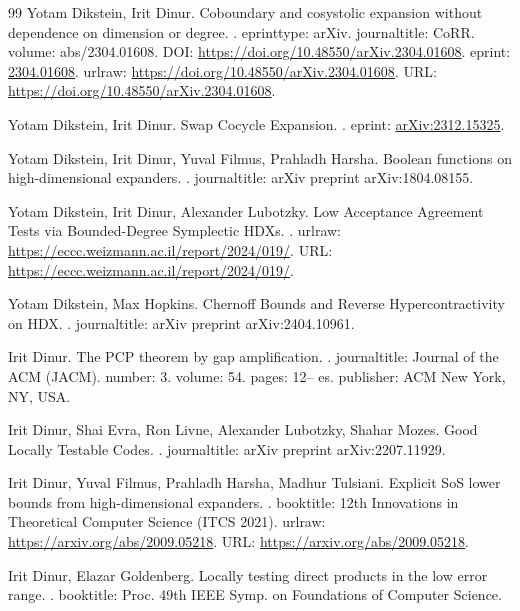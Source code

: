 \documentclass[10pt,a4paper]{article}
\theoremstyle{definition}
\theoremstyle{remark}
\numberwithin{equation}{section}
\begin{document}
\begin{thebibliography}{99}
Yotam Dikstein, Irit Dinur.
\newblock Coboundary and cosystolic expansion without dependence on dimension or degree.
.
\newblock eprinttype: arXiv.
\newblock journaltitle: CoRR.
\newblock volume: abs/2304.01608.
\newblock DOI: \url{https://doi.org/10.48550/arXiv.2304.01608}.
\newblock eprint: \url{2304.01608}.
\newblock urlraw: \url{https://doi.org/10.48550/arXiv.2304.01608}.
\newblock URL: \url{https://doi.org/10.48550/arXiv.2304.01608}.

Yotam Dikstein, Irit Dinur.
\newblock Swap Cocycle Expansion.
.
\newblock eprint: \url{arXiv:2312.15325}.

Yotam Dikstein, Irit Dinur, Yuval Filmus, Prahladh Harsha.
\newblock Boolean functions on high-dimensional expanders.
.
\newblock journaltitle: arXiv preprint arXiv:1804.08155.

Yotam Dikstein, Irit Dinur, Alexander Lubotzky.
\newblock Low Acceptance Agreement Tests via Bounded-Degree Symplectic HDXs.
.
\newblock urlraw: \url{https://eccc.weizmann.ac.il/report/2024/019/}.
\newblock URL: \url{https://eccc.weizmann.ac.il/report/2024/019/}.

Yotam Dikstein, Max Hopkins.
\newblock Chernoff Bounds and Reverse Hypercontractivity on HDX.
.
\newblock journaltitle: arXiv preprint arXiv:2404.10961.

Irit Dinur.
\newblock The PCP theorem by gap amplification.
.
\newblock journaltitle: Journal of the ACM (JACM).
\newblock number: 3.
\newblock volume: 54.
\newblock pages: 12-- es.
\newblock publisher: ACM New York, NY, USA.

Irit Dinur, Shai Evra, Ron Livne, Alexander Lubotzky, Shahar Mozes.
\newblock Good Locally Testable Codes.
.
\newblock journaltitle: arXiv preprint arXiv:2207.11929.

Irit Dinur, Yuval Filmus, Prahladh Harsha, Madhur Tulsiani.
\newblock Explicit SoS lower bounds from high-dimensional expanders.
.
\newblock booktitle: 12th Innovations in Theoretical Computer Science (ITCS 2021).
\newblock urlraw: \url{https://arxiv.org/abs/2009.05218}.
\newblock URL: \url{https://arxiv.org/abs/2009.05218}.

Irit Dinur, Elazar Goldenberg.
\newblock Locally testing direct products in the low error range.
.
\newblock booktitle: Proc. 49th IEEE Symp. on Foundations of Computer Science.


\end{thebibliography}
\end{document}
